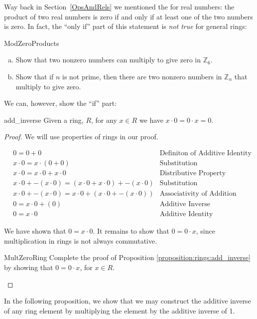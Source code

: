 Way back in Section~\ref{OpsAndRels} we mentioned the  for real numbers: the product of two real numbers is zero if and only if at least one of the two numbers is zero. In fact, the ``only if'' part of this statement is \emph{not true} for general rings:

\begin{exercise}{ModZeroProducts}
\begin{enumerate}[(a)]
\item Show that two nonzero numbers can multiply to give zero in ${\mathbb Z}_6$.
\item Show that if $n$ is not prime, then there are two nonzero numbers in ${\mathbb Z}_n$ that multiply to give zero.
\end{enumerate}
\end{exercise}
We can, however, show the ``if'' part:

\begin{prop}{add_inverse}
Given a ring, $R$, for any $x\in R$ we have $x\cdot0=0\cdot x=0$.

\begin{proof}
We will use properties of rings in our proof.

\begin{align*}
&0=0+0 & \text{Definiton of Additive Identity}\\
&x\cdot0=x\cdot(0+0) & \text{Substitution}\\
&x\cdot0=x\cdot0+x\cdot0 & \text{Distributive Property}\\
&x\cdot0+-(x\cdot0)=(x\cdot0+x\cdot0)+-(x\cdot0) & \text{Substitution}\\
&x\cdot0+-(x\cdot0)=x\cdot0+(x\cdot0+-(x\cdot0)) & \text{Associativity of Addition}\\
&0=x\cdot0+(0) & \text{Additive Inverse}\\
&0=x\cdot0 & \text{Additive Identity}
\end{align*}

We have shown that $0=x\cdot0$. It remains to show that $0=0\cdot x$, since multiplication in rings is not always commutative.

\begin{exercise}{MultZeroRing}
Complete the proof of Proposition \ref{proposition:rings:add_inverse} by showing that $0=0\cdot x$, for $x\in R$.
\end{exercise}
\end{proof}
\end{prop}
In the following proposition, we show that we may construct the additive inverse of any ring element by multiplying the element by the additive inverse of 1.

